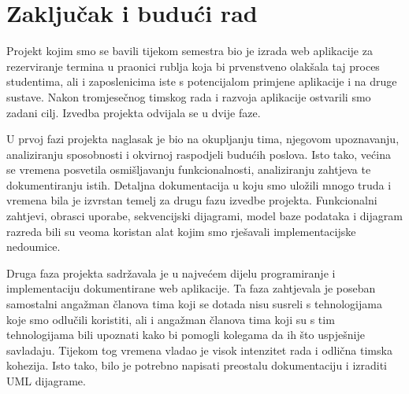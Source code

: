 \chapter{Zaključak i budući rad}
		\begin{comment}
			content..\textbf{\textit{dio 2. revizije}}\\
			
			\textit{U ovom poglavlju potrebno je napisati osvrt na vrijeme izrade projektnog zadatka, koji su tehnički izazovi prepoznati, jesu li riješeni ili kako bi mogli biti riješeni, koja su znanja stečena pri izradi projekta, koja bi znanja bila posebno potrebna za brže i kvalitetnije ostvarenje projekta i koje bi bile perspektive za nastavak rada u projektnoj grupi.}
			
			\textit{Potrebno je točno popisati funkcionalnosti koje nisu implementirane u ostvarenoj aplikaciji.}.
		\end{comment}
		
		Projekt kojim smo se bavili tijekom semestra bio je izrada web aplikacije 
		za rezerviranje termina u praonici rublja koja bi
		prvenstveno olakšala taj proces studentima, ali i zaposlenicima iste s 
		potencijalom primjene aplikacije i na druge sustave.
		Nakon tromjesečnog
		timskog rada i razvoja aplikacije ostvarili smo zadani cilj. Izvedba projekta
		odvijala se u dvije faze.
		
		U prvoj fazi projekta naglasak je bio na okupljanju tima, 
		njegovom upoznavanju, analiziranju sposobnosti i okvirnoj raspodjeli
		budućih poslova. Isto tako, većina se vremena posvetila
		osmišljavanju funkcionalnosti, analiziranju zahtjeva te 
		dokumentiranju istih. Detaljna dokumentacija u koju smo uložili mnogo truda
		i vremena bila je izvrstan temelj za drugu fazu izvedbe projekta. 
		Funkcionalni zahtjevi, obrasci uporabe, sekvencijski dijagrami, model baze
		podataka i dijagram razreda bili su veoma koristan alat kojim smo rješavali
		implementacijske nedoumice. 
		
		Druga faza projekta sadržavala je u najvećem dijelu programiranje i
		implementaciju dokumentirane web aplikacije. Ta faza zahtjevala je 
		poseban samostalni angažman članova tima koji se dotada nisu susreli
		s tehnologijama koje smo odlučili koristiti, ali i angažman 
		članova tima koji su s tim tehnologijama bili upoznati kako bi
		pomogli kolegama da ih što uspješnije savladaju. Tijekom tog vremena
		vladao je visok intenzitet rada i odlična timska kohezija. Isto tako, 
		bilo je potrebno napisati preostalu dokumentaciju i izraditi UML dijagrame.
		

